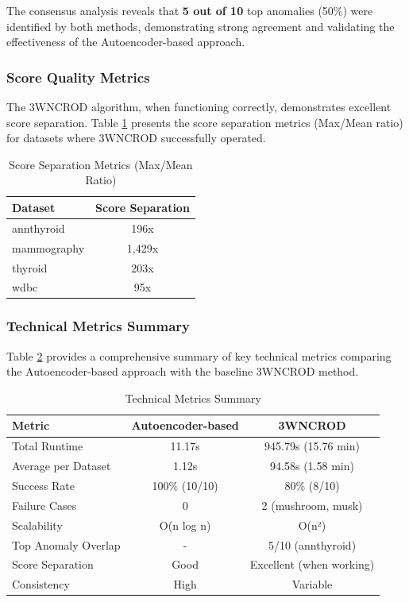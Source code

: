 \documentclass[12pt,a4paper]{article}
\begin{document}
The consensus analysis reveals that \textbf{5 out of 10} top anomalies (50\%) were identified by both methods, demonstrating strong agreement and validating the effectiveness of the Autoencoder-based approach.

\subsubsection{Score Quality Metrics}

The 3WNCROD algorithm, when functioning correctly, demonstrates excellent score separation. Table \ref{tab:score_separation} presents the score separation metrics (Max/Mean ratio) for datasets where 3WNCROD successfully operated.

\begin{table}[h]
\centering
\caption{Score Separation Metrics (Max/Mean Ratio)}
\label{tab:score_separation}
\begin{tabular}{lc}
\toprule
\textbf{Dataset} & \textbf{Score Separation} \\
\midrule
annthyroid & 196x \\
mammography & 1,429x \\
thyroid & 203x \\
wdbc & 95x \\
\bottomrule
\end{tabular}
\end{table}

\subsubsection{Technical Metrics Summary}

Table \ref{tab:technical_metrics} provides a comprehensive summary of key technical metrics comparing the Autoencoder-based approach with the baseline 3WNCROD method.

\begin{table}[h]
\centering
\caption{Technical Metrics Summary}
\label{tab:technical_metrics}
\begin{tabular}{lcc}
\toprule
\textbf{Metric} & \textbf{Autoencoder-based} & \textbf{3WNCROD} \\
\midrule
Total Runtime & 11.17s & 945.79s (15.76 min) \\
Average per Dataset & 1.12s & 94.58s (1.58 min) \\
Success Rate & 100\% (10/10) & 80\% (8/10) \\
Failure Cases & 0 & 2 (mushroom, musk) \\
Scalability & O(n log n) & O(n²) \\
Top Anomaly Overlap & - & 5/10 (annthyroid) \\
Score Separation & Good & Excellent (when working) \\
Consistency & High & Variable \\
\bottomrule
\end{tabular}
\end{table}
\end{document}
